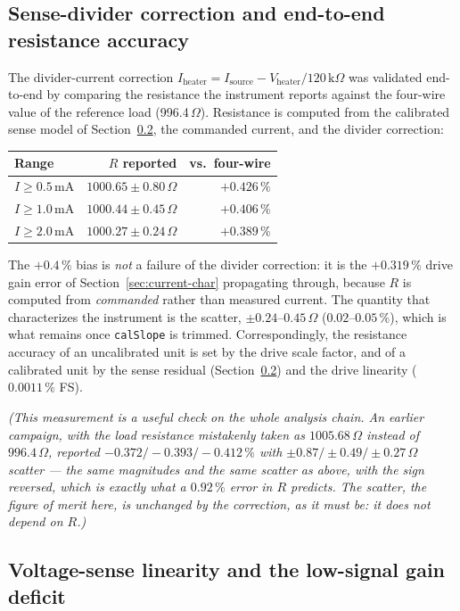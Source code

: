 \documentclass[11pt]{article}
\newif\ifdraft\drafttrue
\newcommand{\note}[1]{\ifdraft{\color{blue!60!black}\textit{(#1)}}\fi}
\begin{document}
\subsection{Sense-divider correction and end-to-end resistance accuracy}
\label{sec:divider-correction}
The divider-current correction
$I_\text{heater}=I_\text{source}-V_\text{heater}/120\,\text{k}\Omega$ was
validated end-to-end by comparing the resistance the instrument reports against
the four-wire value of the reference load (996.4\,$\Omega$). Resistance is
computed from the calibrated sense model of Section~\ref{sec:vsense-linearity},
the commanded current, and the divider correction:

\medskip
\noindent\begin{tabular}{@{}lrr@{}}
\toprule
\textbf{Range} & \textbf{$R$ reported} & \textbf{vs.\ four-wire} \\
\midrule
$I\ge0.5$\,mA & $1000.65\pm0.80\,\Omega$ & $+0.426\,\%$ \\
$I\ge1.0$\,mA & $1000.44\pm0.45\,\Omega$ & $+0.406\,\%$ \\
$I\ge2.0$\,mA & $1000.27\pm0.24\,\Omega$ & $+0.389\,\%$ \\
\bottomrule
\end{tabular}
\medskip

The $+0.4\,\%$ bias is \emph{not} a failure of the divider correction: it is the
$+0.319\,\%$ drive gain error of Section~\ref{sec:current-char} propagating
through, because $R$ is computed from \emph{commanded} rather than measured
current. The quantity that characterizes the instrument is the scatter,
$\pm0.24$--$0.45\,\Omega$ ($0.02$--$0.05\,\%$), which is what remains once
\texttt{calSlope} is trimmed. Correspondingly, the resistance accuracy of an
uncalibrated unit is set by the drive scale factor, and of a calibrated unit by
the sense residual (Section~\ref{sec:vsense-linearity}) and the drive linearity
($0.0011\,\%$ FS).

\note{This measurement is a useful check on the whole analysis chain. An earlier
campaign, with the load resistance mistakenly taken as $1005.68\,\Omega$ instead
of $996.4\,\Omega$, reported $-0.372/-0.393/-0.412\,\%$ with
$\pm0.87/\pm0.49/\pm0.27\,\Omega$ scatter --- the same magnitudes and the same
scatter as above, with the sign reversed, which is exactly what a $0.92\,\%$
error in $R$ predicts. The scatter, the figure of merit here, is unchanged by
the correction, as it must be: it does not depend on $R$.}

\subsection{Voltage-sense linearity and the low-signal gain deficit}
\label{sec:vsense-linearity}
\end{document}
